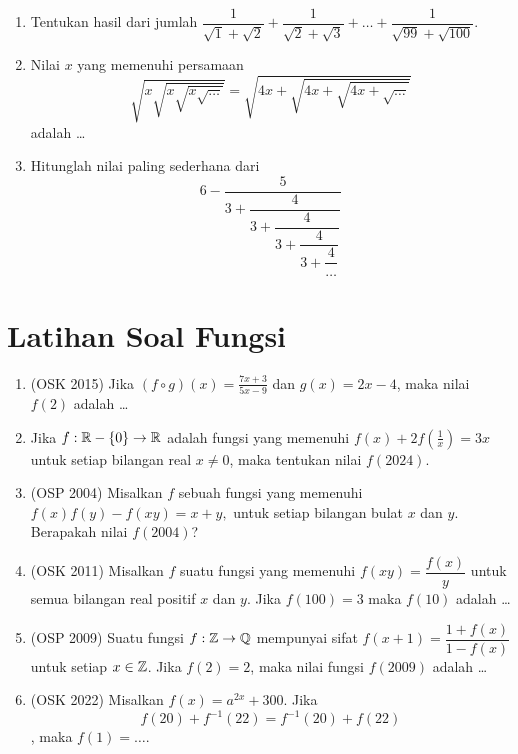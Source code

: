 \documentclass[a4paper]{article}
\begin{document}
\begin{enumerate}
\item Tentukan hasil dari jumlah $\dfrac{1}{\sqrt{1}+\sqrt{2}}+\dfrac{1}{\sqrt{2}+\sqrt{3}}+\dots+\dfrac{1}{\sqrt{99}+\sqrt{100}}.$

\item Nilai $x$ yang memenuhi persamaan
$$\sqrt{x\sqrt{x\sqrt{x\sqrt{\dots}}}}=\sqrt{4x+\sqrt{4x+\sqrt{4x+\sqrt{\dots}}}}$$
adalah \dots

\item Hitunglah nilai paling sederhana dari
$$6-\dfrac{5}{3+\dfrac{4}{3+\dfrac{4}{3+\dfrac{4}{3+\dfrac{4}{\dots}}}}}$$
\end{enumerate}

\section{Latihan Soal Fungsi}
\begin{enumerate}
        \item (OSK 2015) Jika $(f \circ g)(x) = \frac{7x + 3}{5x - 9}$ dan $g(x) = 2x - 4$, maka nilai $f(2)$ adalah \ldots

        \item Jika $f:\mathbb R-\{0\} \rightarrow \mathbb R$ adalah fungsi yang memenuhi $f(x)+2f\left(\frac{1}{x}\right)=3x$ untuk setiap bilangan real $x \neq 0$, maka tentukan nilai $f(2024).$

        \item (OSP 2004) Misalkan $f$ sebuah fungsi yang memenuhi $f(x)f(y)-f(xy)=x+y,$ untuk setiap bilangan bulat $x$ dan $y$. Berapakah nilai $f(2004)$?
        
        \item (OSK 2011) Misalkan $f$ suatu fungsi yang memenuhi $f(xy) = \dfrac{f(x)}{y}$ untuk semua bilangan real positif $x$ dan $y$. Jika $f(100)=3$ maka $f(10)$ adalah \dots
        
        \item (OSP 2009) Suatu fungsi $f:\mathbb Z \rightarrow \mathbb Q$ mempunyai sifat $f(x+1)=\dfrac{1+f(x)}{1-f(x)}$ untuk setiap $x \in \mathbb Z$. Jika $f(2)=2$, maka nilai fungsi $f(2009)$ adalah \dots

        \item (OSK 2022) Misalkan $f(x) = a^{2x} + 300$. Jika
        $$f(20) + f^{-1}(22) = f^{-1}(20) + f(22)$$,
        maka $f(1) = \dots$.

\end{enumerate}
\end{document}
